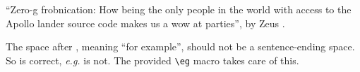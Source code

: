 \documentclass{article}
\begin{document}
``Zero-g frobnication: How being the only people in the world with access to
the Apollo lander source code makes us a wow at parties'', by Zeus \etal.

The space after \eg, meaning ``for example'', should not be a
sentence-ending space. So \eg is correct, {\em e.g.} is not.  The provided
\verb'\eg' macro takes care of this.
\end{document}
